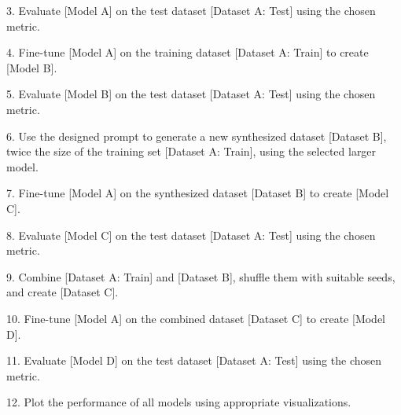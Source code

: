 3. Evaluate [Model A] on the test dataset [Dataset A: Test] using the chosen metric.

4. Fine-tune [Model A] on the training dataset [Dataset A: Train] to create [Model B].

5. Evaluate [Model B] on the test dataset [Dataset A: Test] using the chosen metric.

6. Use the designed prompt to generate a new synthesized dataset [Dataset B],
twice the size of the training set [Dataset A: Train], using the selected larger model.

7. Fine-tune [Model A] on the synthesized dataset [Dataset B] to create [Model C].

8. Evaluate [Model C] on the test dataset [Dataset A: Test] using the chosen metric.

9. Combine [Dataset A: Train] and [Dataset B], shuffle them with suitable seeds, and create [Dataset C].

10. Fine-tune [Model A] on the combined dataset [Dataset C] to create [Model D].

11. Evaluate [Model D] on the test dataset [Dataset A: Test] using the chosen metric.

12. Plot the performance of all models using appropriate visualizations.

